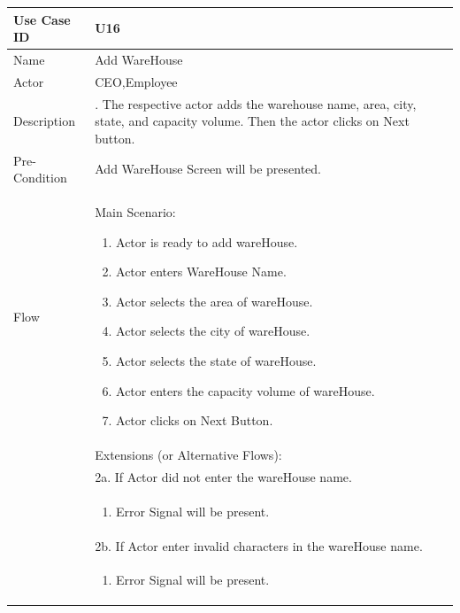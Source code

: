 \documentclass[12pt,a4paper]{report}
\begin{document}
\begin{tabular}{ | m{3cm} | m{12cm}| } \hline

Use Case ID & U16  \\\hline

Name  	    & Add WareHouse  \\ \hline

Actor     	& CEO,Employee\\ \hline

Description &  . The respective actor adds the warehouse name, area, city, state, and capacity volume. Then the actor clicks on Next button. \\ \hline

Pre-Condition &  Add WareHouse Screen will be presented. \\ \hline

Flow       & Main Scenario:

\begin{enumerate}
\item Actor is ready to add wareHouse.
\item Actor enters WareHouse Name.
\item Actor selects the area of wareHouse.
\item Actor selects the city of wareHouse.
\item Actor selects the state of wareHouse.
\item Actor enters the capacity volume of wareHouse.
\item Actor clicks on Next Button.

\end{enumerate}\\


&Extensions (or Alternative Flows):\\
& 2a. If Actor did not enter the wareHouse name. \\
& \begin{enumerate}
		\item Error Signal will be present.
	\end{enumerate}
\\ 
& 2b. If Actor enter invalid characters in the wareHouse name. \\
& \begin{enumerate}
		\item Error Signal will be present.
	\end{enumerate}
\\ \hline
\end{tabular}
\end{document}
